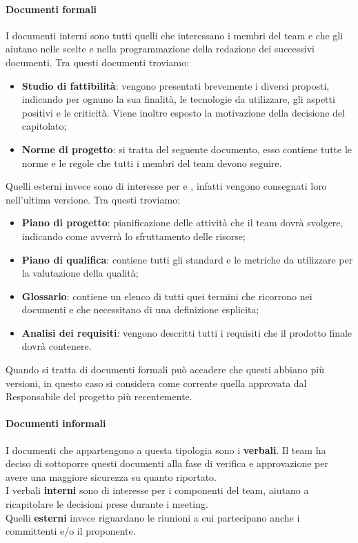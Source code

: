 \paragraph{Documenti formali} 
I documenti interni sono tutti quelli che interessano i membri del team e che gli aiutano nelle scelte e nella programmazione della redazione dei successivi documenti. 
Tra questi documenti troviamo:
\begin{itemize}
\item\textbf{Studio di fattibilità}: vengono presentati brevemente i diversi  proposti, indicando per ognuno la sua finalità, le tecnologie da utilizzare, gli aspetti positivi e le criticità. Viene inoltre esposto la motivazione della decisione del capitolato;
\item\textbf{Norme di progetto}: si tratta del seguente documento, esso contiene tutte le norme e le regole che tutti i membri del team devono seguire.
\end{itemize}
Quelli esterni invece sono di interesse per  e , infatti vengono consegnati loro nell'ultima versione.
Tra questi troviamo:
\begin{itemize}
\item\textbf{Piano di progetto}: pianificazione delle attività che il team dovrà svolgere, indicando come avverrà lo sfruttamento delle risorse;
\item\textbf{Piano di qualifica}: contiene tutti gli standard e le metriche da utilizzare per la valutazione della qualità;
\item\textbf{Glossario}: contiene un elenco di tutti quei termini che ricorrono nei documenti e che necessitano di una definizione esplicita;
\item\textbf{Analisi dei requisiti}: vengono descritti tutti i requisiti che il prodotto finale dovrà contenere. 
\end{itemize}
Quando si tratta di documenti formali può accadere che questi abbiano più versioni, in questo caso si considera come corrente quella approvata dal Responsabile del progetto più recentemente.

\paragraph{Documenti informali} 
I documenti che appartengono a questa tipologia sono i \textbf{verbali}.
Il team ha deciso di sottoporre questi documenti alla fase di verifica e approvazione per avere una maggiore sicurezza su quanto riportato.\\
I verbali \textbf{interni} sono di interesse per i componenti del team, aiutano a ricapitolare le decisioni prese durante i meeting.\\
Quelli \textbf{esterni} invece riguardano le riunioni a cui partecipano anche i committenti e/o il proponente.

